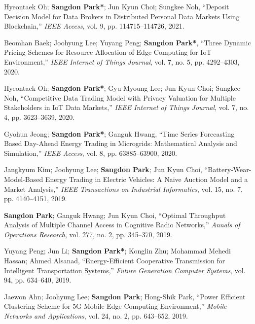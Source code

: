 \documentclass[11pt,a4paper]{article}
\begin{document}
\begin{enumerate}[label={[{\arabic*}]}, leftmargin=*, itemsep=0.3em]
\item Hyeontaek Oh; \textbf{Sangdon Park*}; Jun Kyun Choi; Sungkee Noh, ``Deposit Decision Model for Data Brokers in Distributed Personal Data Markets Using Blockchain,'' \textit{IEEE Access}, vol. 9, pp. 114715--114726, 2021.

\item Beomhan Baek; Joohyung Lee; Yuyang Peng; \textbf{Sangdon Park*}, ``Three Dynamic Pricing Schemes for Resource Allocation of Edge Computing for IoT Environment,'' \textit{IEEE Internet of Things Journal}, vol. 7, no. 5, pp. 4292--4303, 2020.

\item Hyeontaek Oh; \textbf{Sangdon Park*}; Gyu Myoung Lee; Jun Kyun Choi; Sungkee Noh, ``Competitive Data Trading Model with Privacy Valuation for Multiple Stakeholders in IoT Data Markets,'' \textit{IEEE Internet of Things Journal}, vol. 7, no. 4, pp. 3623--3639, 2020.

\item Gyohun Jeong; \textbf{Sangdon Park*}; Ganguk Hwang, ``Time Series Forecasting Based Day-Ahead Energy Trading in Microgrids: Mathematical Analysis and Simulation,'' \textit{IEEE Access}, vol. 8, pp. 63885--63900, 2020.

\item Jangkyum Kim; Joohyung Lee; \textbf{Sangdon Park}; Jun Kyun Choi, ``Battery-Wear-Model-Based Energy Trading in Electric Vehicles: A Naive Auction Model and a Market Analysis,'' \textit{IEEE Transactions on Industrial Informatics}, vol. 15, no. 7, pp. 4140--4151, 2019.

\item \textbf{Sangdon Park}; Ganguk Hwang; Jun Kyun Choi, ``Optimal Throughput Analysis of Multiple Channel Access in Cognitive Radio Networks,'' \textit{Annals of Operations Research}, vol. 277, no. 2, pp. 345--370, 2019.

\item Yuyang Peng; Jun Li; \textbf{Sangdon Park*}; Konglin Zhu; Mohammad Mehedi Hassan; Ahmed Alsanad, ``Energy-Efficient Cooperative Transmission for Intelligent Transportation Systems,'' \textit{Future Generation Computer Systems}, vol. 94, pp. 634--640, 2019.

\item Jaewon Ahn; Joohyung Lee; \textbf{Sangdon Park}; Hong-Shik Park, ``Power Efficient Clustering Scheme for 5G Mobile Edge Computing Environment,'' \textit{Mobile Networks and Applications}, vol. 24, no. 2, pp. 643--652, 2019.


\end{enumerate}
\end{document}
